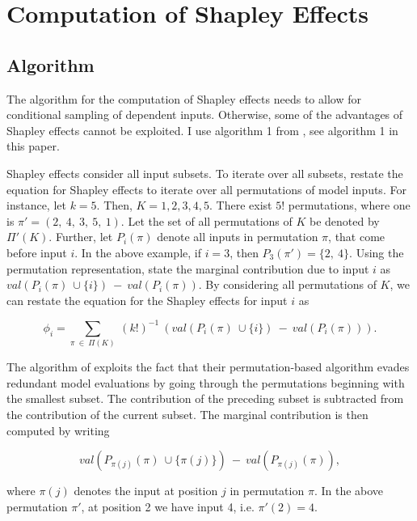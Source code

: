 \section{Computation of Shapley Effects} \label{comp_shap}

\subsection{Algorithm}

The algorithm for the computation of Shapley effects needs to allow for conditional sampling of dependent inputs. Otherwise, some of the advantages of Shapley effects cannot be exploited. I use algorithm 1 from \citet{SNS16}, see algorithm 1 in this paper.

Shapley effects consider all input subsets. To iterate over all subsets, \citet{SNS16} restate the equation for Shapley effects to iterate over all permutations of model inputs. For instance, let $k=5$. Then, $K={1, 2, 3, 4, 5}$. There exist $5!$ permutations, where one is $\pi{\prime}=(2,\ 4,\ 3,\ 5,\ 1)$. Let the set of all permutations of $K$ be denoted by $\Pi{\prime}(K)$. Further, let $P_i(\pi)$ denote all inputs in permutation $\pi$, that come before input $i$. In the above example, if $i=3$, then $P_3(\pi{\prime})=\{2,\ 4\}$. Using the permutation representation, \citet{SNS16} state the marginal contribution due to input $i$ as $val(P_i(\pi)\ \cup\{i\})\ -\ val(P_i(\pi))$. By considering all permutations of $K$, we can restate the equation for the Shapley effects for input $i$ as

\begin{equation}
\phi_i=\sum_{\pi\ \in\ \Pi(K)}\ (k!)^{-1}\ (val(P_i(\pi)\ \cup\{i\})\ -\ val(P_i(\pi))).
\end{equation}

The algorithm of \citet{SNS16} exploits the fact that their permutation-based algorithm evades redundant model evaluations by going through the permutations beginning with the smallest subset. The contribution of the preceding subset is subtracted from the contribution of the current subset. The marginal contribution is then computed by writing

\begin{equation}
val(P_{\pi(j)}(\pi)\ \cup\{\pi(j)\})\ -\ val(P_{\pi(j)}(\pi)),
\end{equation}

\noindent where $\pi(j)$ denotes the input at position $j$ in permutation $\pi$. In the above permutation $\pi{\prime}$, at position 2 we have input 4, i.e. $\pi{\prime}(2)=4$.

